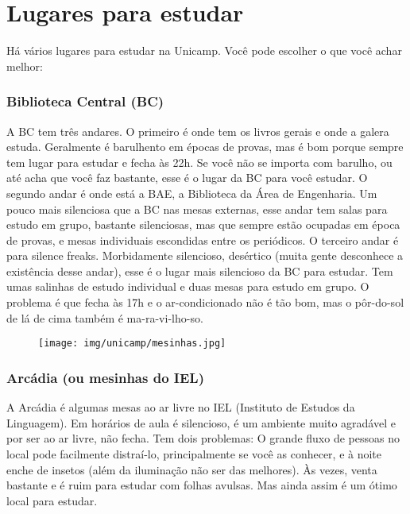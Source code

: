
\section{Lugares para estudar}

Há vários lugares para estudar na Unicamp. Vo\-cê pode escolher o que você
achar melhor:

\subsubsection{Biblioteca Central (BC)}

A BC tem três andares. O primeiro é onde tem os livros gerais e onde a galera
estuda. Geralmente é barulhento em épocas de provas, mas é bom porque sempre
tem lugar para estudar e fecha às 22h. Se você não se importa com barulho, ou
até acha que você faz bastante, esse é o lugar da BC para você estudar. O
segundo andar é onde está a BAE, a Biblioteca da Área de Engenharia. Um pouco
mais silenciosa que a BC nas mesas externas, esse andar tem salas para estudo
em grupo, bastante silenciosas, mas que sempre estão ocupadas em época de
provas, e mesas individuais escondidas entre os periódicos. O terceiro andar é
para silence freaks. Morbidamente silencioso, desértico (muita gente desconhece
a existência desse andar), esse é o lugar mais silencioso da BC para estudar.
Tem umas salinhas de estudo individual e duas mesas para estudo em grupo. O
problema é que fecha às 17h e o ar-condicionado não é tão bom, mas o pôr-do-sol
de lá de cima também é ma-ra-vi-lho-so.

\begin{figure}[h!]
  \centering
  \texttt{[image: img/unicamp/mesinhas.jpg]}
\end{figure}

\subsubsection{Arcádia (ou mesinhas do IEL)}

A Arcádia é algumas mesas ao ar livre no IEL (Instituto de Estudos da
Linguagem). Em horários de aula é silencioso, é um ambiente muito agradável e
por ser ao ar livre, não fecha. Tem dois problemas: O grande fluxo de pessoas
no local pode facilmente distraí-lo, principalmente se você as conhecer, e à
noite enche de insetos (além da iluminação não ser das melhores). Às vezes,
venta bastante e é ruim para estudar com folhas avulsas. Mas ainda assim é um
ótimo local para estudar.


